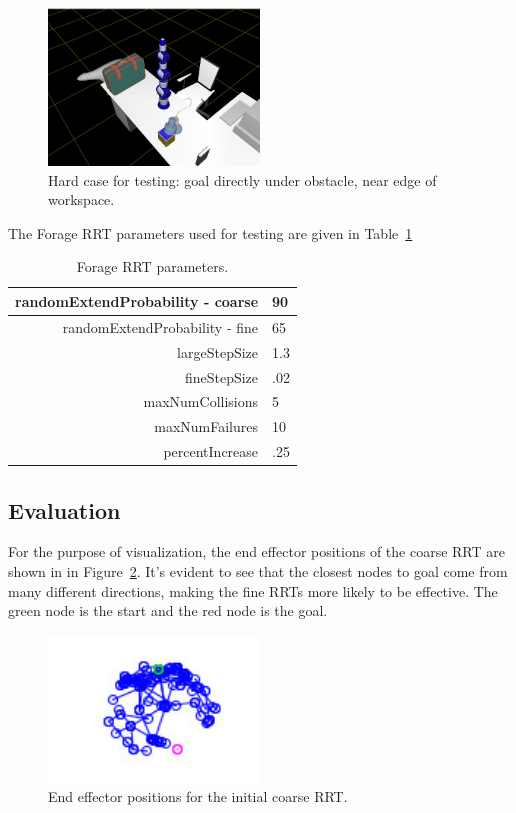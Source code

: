 \documentclass[conference]{IEEEtran}
\begin{document}
\begin{figure}[h!]
  \centering
    \includegraphics[width=0.5\textwidth]{figures/HardCase.jpg}
  \caption{Hard case for testing: goal directly under obstacle, near edge of workspace. \label{fig:HardCase} }
\end{figure}

The Forage RRT parameters used for testing are given in Table~\ref{tab:ForageParams}

\begin{table}
	\centering
	\begin{tabular}{| r | l | }
        	\hline
  		randomExtendProbability - coarse & 90 \\ \hline
  		randomExtendProbability - fine & 65 \\ \hline
  		largeStepSize & 1.3\\ \hline
  		fineStepSize & .02\\ \hline
  		maxNumCollisions & 5\\ \hline
  		maxNumFailures & 10\\ \hline
		percentIncrease & .25\\ \hline 
	\end{tabular}
	\caption{Forage RRT parameters.} 
	\label{tab:ForageParams}
\end{table}

\subsection{Evaluation}
For the purpose of visualization, the end effector positions of the coarse RRT are shown in in Figure~\ref{fig:CoarseRRT}. It's evident to
see that the closest nodes to goal come from many different directions, making the fine RRTs more likely to be effective. The green node is
the start and the red node is the goal.

\begin{figure}[h!]
  \centering
    \includegraphics[width=0.5\textwidth]{figures/coarseRRTExample.jpg}
  \caption{End effector positions for the initial coarse RRT. \label{fig:CoarseRRT} }
\end{figure}
\end{document}
